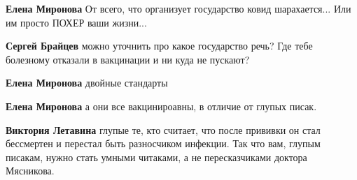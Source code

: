\begin{itemize}
\begin{itemize}
 
\textbf{Елена Миронова} От всего, что организует государство ковид шарахается...
Или им просто ПОХЕР ваши жизни...

 
\textbf{Сергей Брайцев} можно уточнить про какое государство речь? Где тебе болезному отказали в вакцинации и ни куда не пускают?

 
\textbf{Елена Миронова} двойные стандарты

 
\textbf{Елена Миронова} а они все вакцинироавны, в отличие от глупых писак.

 
\textbf{Виктория Летавина} глупые те, кто считает, что после прививки он стал бессмертен и перестал быть разносчиком инфекции. Так что вам, глупым писакам, нужно стать умными читаками, а не пересказчиками доктора Мясникова.

 

\end{itemize}
\end{itemize}
